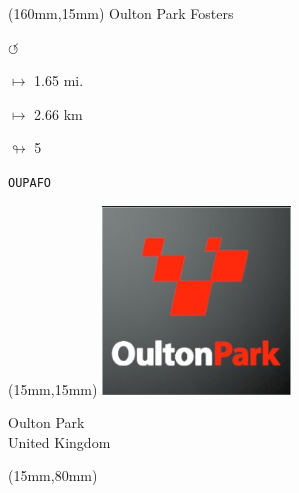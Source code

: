 \begin{textblock*}{40mm}(160mm,15mm)%
Oulton Park Fosters
\par \Huge$\circlearrowleft$
\Large
\par$\mapsto$ 1.65 mi.
\par$\mapsto$ 2.66 km
\par$\looparrowright$ 5
\par\hfill\tiny\tt OUPAFO\\
\end{textblock*}
\null\newpage

\begin{textblock*}{50mm}(15mm,15mm)%
\includegraphics[width=50mm]{LG/2015-05-20_00091.png}
\par Oulton Park\\ United Kingdom
\end{textblock*}
\begin{textblock*}{185mm}(15mm,80mm)%
\end{textblock*}
